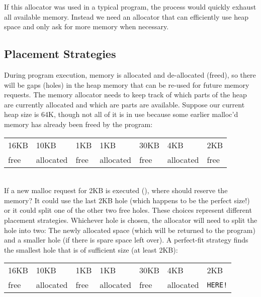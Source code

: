 If this allocator was used in a typical program, the process would quickly exhaust all available memory. Instead we need an allocator that can efficiently use heap space and only ask for more memory when necessary.

\subsection{Placement Strategies}

During program execution, memory is allocated and de-allocated (freed), so there will be gaps (holes) in the heap memory that can be re-used for future memory requests. The memory allocator needs to keep track of which parts of the heap are currently allocated and which are parts are available. Suppose our current heap size is 64K, though not all of it is in use because some earlier malloc'd memory has already been freed by the program:
\\
\begin{center}
\begin{tabularx}{\textwidth}{ | X | X | X | X | X | X | X | }
\hline
16KB & 10KB & 1KB & 1KB & 30KB & 4KB & 2KB \\
free & allocated & free & allocated & free & allocated & free \\
\hline
\end{tabularx}
\end{center}
\\
If a new malloc request for 2KB is executed (), where should  reserve the memory? It could use the last 2KB hole (which happens to be the perfect size!) or it could split one of the other two free holes. These choices represent different placement strategies. Whichever hole is chosen, the allocator will need to split the hole into two: The newly allocated space (which will be returned to the program) and a smaller hole (if there is spare space left over). A perfect-fit strategy finds the smallest hole that is of sufficient size (at least 2KB):
\\
\begin{center}
\begin{tabularx}{\textwidth}{ | X | X | X | X | X | X | X | }
\hline
16KB & 10KB & 1KB & 1KB & 30KB & 4KB & 2KB \\
free & allocated & free & allocated & free & allocated & \texttt{HERE!} \\
\hline
\end{tabularx}
\end{center}
\\

